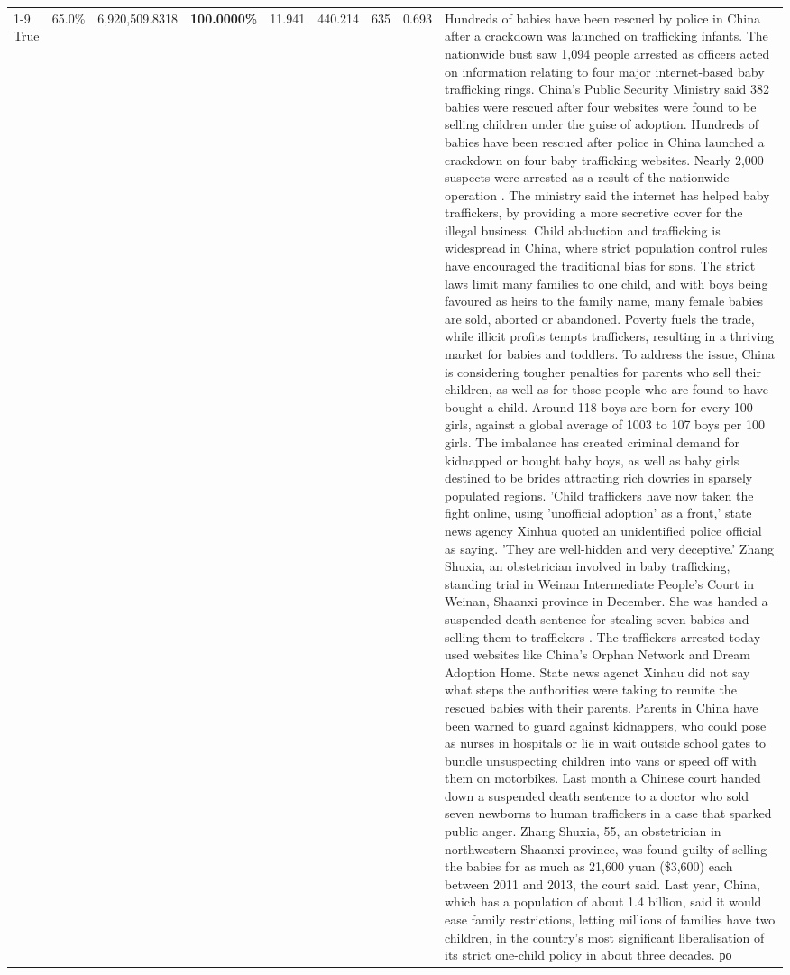 \begin{table}[H]
\begin{tabular}{lllrlllll}
\cline{1-9}
True & 65.0\% & 6,920,509.8318 & \bfseries \color{red} 100.0000\% & 11.941 & 440.214 & 635 & 0.693 & Hundreds of babies have been rescued by police in China after a crackdown was launched on trafficking infants. The nationwide bust saw 1,094 people arrested as officers acted on information relating to four major internet-based baby trafficking rings. China's Public Security Ministry said 382 babies were rescued after four websites were found to be selling children under the guise of adoption. Hundreds of babies have been rescued after police in China launched a crackdown on four baby trafficking websites. Nearly 2,000 suspects were arrested as a result of the nationwide operation . The ministry said the internet has helped baby traffickers, by providing a more secretive cover for the illegal business. Child abduction and trafficking is widespread in China, where strict population control rules have encouraged the traditional bias for sons. The strict laws limit many families to one child, and with boys being favoured as heirs to the family name, many female babies are sold, aborted or abandoned. Poverty fuels the trade, while illicit profits tempts traffickers, resulting in a thriving market for babies and toddlers. To address the issue, China is considering tougher penalties for parents who sell their children, as well as for those people who are found to have bought a child. Around 118 boys are born for every 100 girls, against a global average of 1003 to 107 boys per 100 girls. The imbalance has created criminal demand for kidnapped or bought baby boys, as well as baby girls destined to be brides attracting rich dowries in sparsely populated regions. 'Child traffickers have now taken the fight online, using 'unofficial adoption' as a front,' state news agency Xinhua quoted an unidentified police official as saying. 'They are well-hidden and very deceptive.' Zhang Shuxia, an obstetrician involved in baby trafficking, standing trial in Weinan Intermediate People's Court in Weinan, Shaanxi province in December. She was handed a suspended death sentence for stealing seven babies and selling them to traffickers . The traffickers arrested today used websites like China's Orphan Network and Dream Adoption Home. State news agenct Xinhau did not say what steps the authorities were taking to reunite the rescued babies with their parents. Parents in China have been warned to guard against kidnappers, who could pose as nurses in hospitals or lie in wait outside school gates to bundle unsuspecting children into vans or speed off with them on motorbikes. Last month a Chinese court handed down a suspended death sentence to a doctor who sold seven newborns to human traffickers in a case that sparked public anger. Zhang Shuxia, 55, an obstetrician in northwestern Shaanxi province, was found guilty of selling the babies for as much as 21,600 yuan (\$3,600) each between 2011 and 2013, the court said. Last year, China, which has a population of about 1.4 billion, said it would ease family restrictions, letting millions of families have two children, in the country's most significant liberalisation of its strict one-child policy in about three decades. ро \\

\end{tabular}
\end{table}
